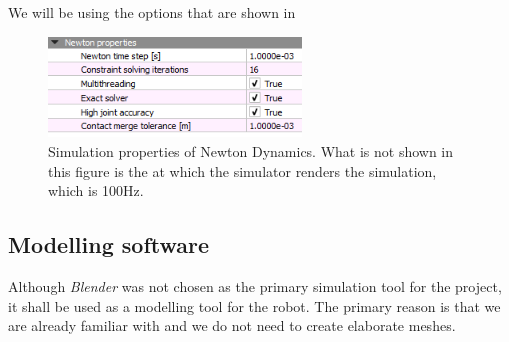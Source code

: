 We will be using the options that are shown in 

\begin{figure}[htp]
	\centering
	\includegraphics[width=0.6\textwidth]{figures/newton_options}
	\caption{Simulation properties of Newton Dynamics. What is not shown in this figure is the at which the simulator renders the simulation, which is 100Hz. \label{fig:newton_options}}
\end{figure}

\subsection{Modelling software}
Although \emph{Blender} was not chosen as the primary simulation tool for the project, it shall be used as a modelling tool for the robot. The primary reason is that we are already familiar with and we do not need to create elaborate meshes.